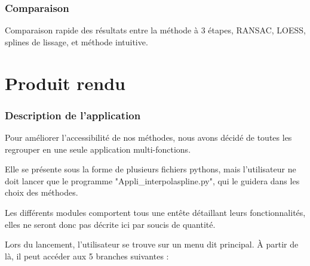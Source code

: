 \documentclass[a4paper,12pt]{article} %
\begin{document}
    \section{Comparaison}
    Comparaison rapide des résultats entre la méthode à 3 étapes, RANSAC, LOESS, splines de lissage, et méthode intuitive. 
        

\renewcommand\partname{}
\part{Produit rendu}

\section{Description de l'application}

Pour améliorer l'accessibilité de nos méthodes, nous avons décidé de toutes les regrouper en une seule application multi-fonctions.

Elle se présente sous la forme de plusieurs fichiers pythons, mais l'utilisateur ne doit lancer que le programme "Appli\_interpolaspline.py", qui le guidera dans les choix des méthodes.

Les différents modules comportent tous une entête détaillant leurs fonctionnalités, elles ne seront donc pas décrite ici par soucis de quantité.

Lors du lancement, l'utilisateur se trouve sur un menu dit principal. À partir de là, il peut accéder aux 5 branches suivantes :
\end{document}

